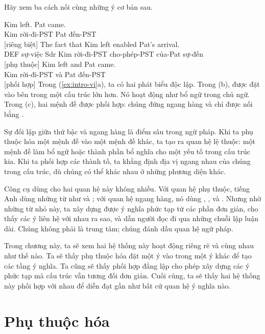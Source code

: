 Hãy xem ba cách nối cùng những ý cơ bản sau.

\ea \label{ex:intro-vi}
    \ea \gll Kim left. Pat came.\\
        Kim rời-đi-PST Pat đến-PST\\
    \glt {} [riêng biệt]
    \ex \gll The fact {\ob}that Kim left{\cb} enabled Pat's arrival.\\
        DEF sự-việc Sdr Kim rời-đi-PST cho-phép-PST của-Pat sự-đến\\
    \glt {} [phụ thuộc]
    \ex \gll Kim left and Pat came.\\
        Kim rời-đi-PST và Pat đến-PST\\
    \glt {} [phối hợp]
    \z
\z
Trong (\ref{ex:intro-vi}a), ta có hai phát biểu độc lập. Trong (b),  được đặt vào bên trong một cấu trúc lớn hơn. Nó hoạt động như bổ ngữ trong chủ ngữ. Trong (c), hai mệnh đề được phối hợp: chúng đứng ngang hàng và chỉ được nối bằng .

Sự đối lập giữa thứ bậc và ngang hàng là điểm sâu trong ngữ pháp. Khi ta phụ thuộc hóa một mệnh đề vào một mệnh đề khác, ta tạo ra quan hệ lệ thuộc: một mệnh đề làm bổ ngữ hoặc thành phần bổ nghĩa cho một yếu tố trong cấu trúc kia. Khi ta phối hợp các thành tố, ta khẳng định địa vị ngang nhau của chúng trong cấu trúc, dù chúng có thể khác nhau ở những phương diện khác.

Công cụ dùng cho hai quan hệ này không nhiều. Với quan hệ phụ thuộc, tiếng Anh dùng những từ như  và ; với quan hệ ngang hàng, nó dùng , , và . Nhưng nhờ những từ nhỏ này, ta xây dựng được ý nghĩa phức tạp từ các phần đơn giản, cho thấy các ý liên hệ với nhau ra sao, và dẫn người đọc đi qua những chuỗi lập luận dài. Chúng không phải là trung tâm; chúng đánh dấu quan hệ ngữ pháp.

Trong chương này, ta sẽ xem hai hệ thống này hoạt động riêng rẽ và cùng nhau như thế nào. Ta sẽ thấy phụ thuộc hóa đặt một ý vào trong một ý khác để tạo các tầng ý nghĩa. Ta cũng sẽ thấy phối hợp đẳng lập cho phép xây dựng các ý phức tạp mà cấu trúc vẫn tương đối đơn giản. Cuối cùng, ta sẽ thấy hai hệ thống này phối hợp với nhau để diễn đạt gần như bất cứ quan hệ ý nghĩa nào.

\section{Phụ thuộc hóa}\label{sec:subordination-vi}

